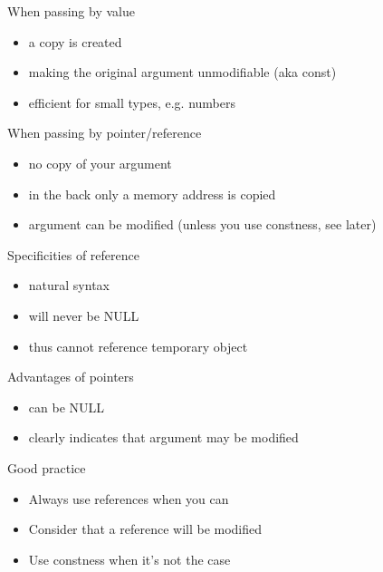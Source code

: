 \begin{frame}[fragile]
  \begin{block}{When passing by value}
    \begin{itemize}
    \item a copy is created
    \item making the original argument unmodifiable (aka const)
    \item efficient for small types, e.g. numbers
    \end{itemize}
  \end{block}
  \begin{block}{When passing by pointer/reference}
    \begin{itemize}
    \item no copy of your argument
    \item in the back only a memory address is copied
    \item argument can be modified (unless you use constness, see later)
    \end{itemize}
  \end{block}
\end{frame}

\begin{frame}[fragile]
  \begin{block}{Specificities of reference}
    \begin{itemize}
    \item natural syntax
    \item will never be NULL
    \item thus cannot reference temporary object
    \end{itemize}
  \end{block}
  \begin{block}{Advantages of pointers}
    \begin{itemize}
    \item can be NULL
    \item clearly indicates that argument may be modified
    \end{itemize}
  \end{block}
  \pause
  \begin{alertblock}{Good practice}
    \begin{itemize}
      \item Always use references when you can
      \item Consider that a reference will be modified
      \item Use constness when it's not the case
    \end{itemize}
  \end{alertblock}
\end{frame}

